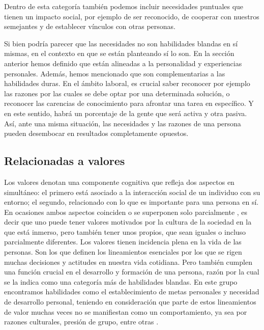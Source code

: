 \documentclass[conference]{IEEEtran}
\begin{document}
Dentro de esta categoría también podemos incluir necesidades puntuales que tienen un impacto social, por ejemplo de ser reconocido, de cooperar con nuestros semejantes y de establecer vínculos con otras personas.


Si bien podría parecer que las necesidades no son habilidades blandas en sí mismas, en el contexto en que se están planteando sí lo son. En la sección anterior hemos definido que están alineadas a la personalidad y experiencias personales. Además, hemos mencionado que son complementarias a las habilidades duras. En el ámbito laboral, es crucial saber reconocer por ejemplo las razones por las cuales se debe optar por una determinada solución, o reconocer las carencias de conocimiento para afrontar una tarea en específico. Y en este sentido, habrá un porcentaje de la gente que será activa y otra pasiva. Así, ante una misma situación, las necesidades y las razones de una persona pueden desembocar en resultados completamente opuestos.

\subsection{Relacionadas a valores}
\label{scrivauto:6}

Los valores denotan una componente cognitiva que refleja dos aspectos en simultáneo: el primero está asociado a la interacción social de un individuo con su entorno; el segundo, relacionado con lo que es importante para una persona en sí. En ocasiones ambos aspectos coinciden o se superponen solo parcialmente \cite{b7}, es decir que uno puede tener valores motivados por la cultura de la sociedad en la que está inmerso, pero también tener unos propios, que sean iguales o incluso parcialmente diferentes.
Los valores tienen incidencia plena en la vida de las personas. Son los que definen los lineamientos esenciales por los que se rigen muchas decisiones y actitudes en nuestra vida cotidiana. Pero también cumplen una función crucial en el desarrollo y formación de una persona, razón por la cual se la indica como una categoría más de habilidades blandas.
En este grupo encontramos habilidades como el establecimiento de metas personales y necesidad de desarrollo personal, teniendo en consideración que parte de estos lineamientos de valor muchas veces no se manifiestan como un comportamiento, ya sea por razones culturales, presión de grupo, entre otras \cite{b7}.
\end{document}
